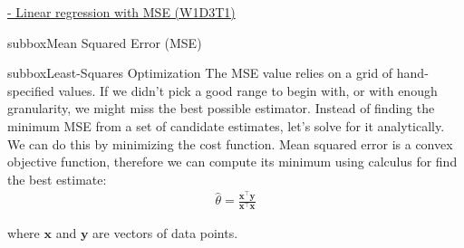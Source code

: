 \begin{textbox}{\href{https://compneuro.neuromatch.io/tutorials/W1D3_ModelFitting/chapter_title.html}{ -  Linear regression with MSE (W1D3T1)}}
\begin{subbox}{subbox}{Mean Squared Error (MSE)}
\end{subbox}
\begin{subbox}{subbox}{Least-Squares Optimization}
\scriptsize
The MSE value relies on a grid of hand-specified values. If we didn't pick a good range to begin with, or with enough granularity, we might miss the best possible estimator. Instead of finding the minimum MSE from a set of candidate estimates, let's solve for it analytically.
We can do this by minimizing the cost function. Mean squared error is a convex objective function, therefore we can compute its minimum using calculus for find the best estimate: \begin{align}
\hat\theta = \frac{\mathbf{x}^\top \mathbf{y}}{\mathbf{x}^\top \mathbf{x}}
\end{align}

where $\mathbf{x}$ and $\mathbf{y}$ are vectors of data points.

\end{subbox}

\end{textbox}
